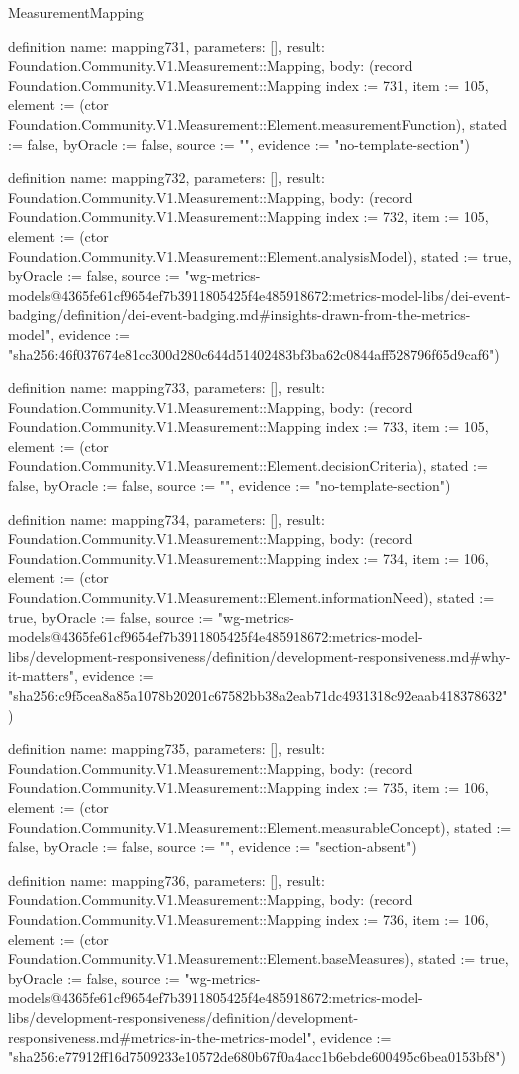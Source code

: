 \begin{lexlean}{MeasurementMapping}
\begin{semanticmodule}
definition{
  name: mapping731,
  parameters: [],
  result: Foundation.Community.V1.Measurement::Mapping,
  body: (record Foundation.Community.V1.Measurement::Mapping {index := 731, item := 105, element := (ctor Foundation.Community.V1.Measurement::Element.measurementFunction), stated := false, byOracle := false, source := "", evidence := "no-template-section"})
}

definition{
  name: mapping732,
  parameters: [],
  result: Foundation.Community.V1.Measurement::Mapping,
  body: (record Foundation.Community.V1.Measurement::Mapping {index := 732, item := 105, element := (ctor Foundation.Community.V1.Measurement::Element.analysisModel), stated := true, byOracle := false, source := "wg-metrics-models@4365fe61cf9654ef7b3911805425f4e485918672:metrics-model-libs/dei-event-badging/definition/dei-event-badging.md#insights-drawn-from-the-metrics-model", evidence := "sha256:46f037674e81cc300d280c644d51402483bf3ba62c0844aff528796f65d9caf6"})
}

definition{
  name: mapping733,
  parameters: [],
  result: Foundation.Community.V1.Measurement::Mapping,
  body: (record Foundation.Community.V1.Measurement::Mapping {index := 733, item := 105, element := (ctor Foundation.Community.V1.Measurement::Element.decisionCriteria), stated := false, byOracle := false, source := "", evidence := "no-template-section"})
}

definition{
  name: mapping734,
  parameters: [],
  result: Foundation.Community.V1.Measurement::Mapping,
  body: (record Foundation.Community.V1.Measurement::Mapping {index := 734, item := 106, element := (ctor Foundation.Community.V1.Measurement::Element.informationNeed), stated := true, byOracle := false, source := "wg-metrics-models@4365fe61cf9654ef7b3911805425f4e485918672:metrics-model-libs/development-responsiveness/definition/development-responsiveness.md#why-it-matters", evidence := "sha256:c9f5cea8a85a1078b20201c67582bb38a2eab71dc4931318c92eaab418378632"})
}

definition{
  name: mapping735,
  parameters: [],
  result: Foundation.Community.V1.Measurement::Mapping,
  body: (record Foundation.Community.V1.Measurement::Mapping {index := 735, item := 106, element := (ctor Foundation.Community.V1.Measurement::Element.measurableConcept), stated := false, byOracle := false, source := "", evidence := "section-absent"})
}

definition{
  name: mapping736,
  parameters: [],
  result: Foundation.Community.V1.Measurement::Mapping,
  body: (record Foundation.Community.V1.Measurement::Mapping {index := 736, item := 106, element := (ctor Foundation.Community.V1.Measurement::Element.baseMeasures), stated := true, byOracle := false, source := "wg-metrics-models@4365fe61cf9654ef7b3911805425f4e485918672:metrics-model-libs/development-responsiveness/definition/development-responsiveness.md#metrics-in-the-metrics-model", evidence := "sha256:e77912ff16d7509233e10572de680b67f0a4acc1b6ebde600495c6bea0153bf8"})
}


\end{semanticmodule}
\end{lexlean}

